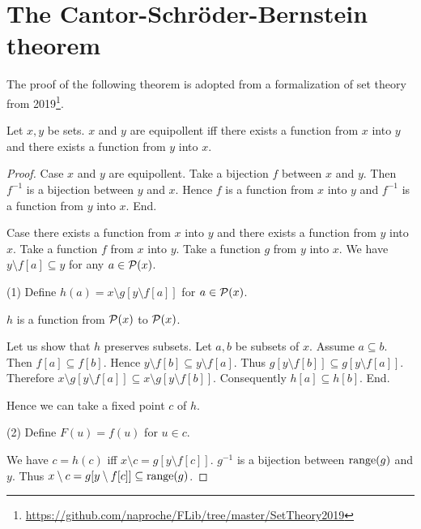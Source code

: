 \documentclass[../../sets-and-functions.ftl.tex]{subfiles}
\begin{document}
  \section{The Cantor-Schröder-Bernstein theorem}

  The proof of the following theorem is adopted from a formalization of set theory from 2019\footnote{\url{https://github.com/naproche/FLib/tree/master/SetTheory2019}}.

  \begin{forthel}
    \begin{theorem}
      Let $x,y$ be sets.
      $x$ and $y$ are equipollent iff there exists a function from $x$ into $y$ and there exists a function from $y$ into $x$.
    \end{theorem}
    \begin{proof}
      Case $x$ and $y$ are equipollent.
        Take a bijection $f$ between $x$ and $y$.
        Then $f^{-1}$ is a bijection between $y$ and $x$.
        Hence $f$ is a function from $x$ into $y$ and $f^{-1}$ is a function from $y$ into $x$.
      End.

      Case there exists a function from $x$ into $y$ and there exists a function from $y$ into $x$.
        Take a function $f$ from $x$ into $y$.
        Take a function $g$ from $y$ into $x$.
        We have $y \setminus f[a] \subseteq y$ for any $a \in \mathcal{P}(x)$.

        (1) Define $h(a) = x \setminus g[y \setminus f[a]]$ for $a \in \mathcal{P}(x)$.

        $h$ is a function from $\mathcal{P}(x)$ to $\mathcal{P}(x)$.

        Let us show that $h$ preserves subsets.
          Let $a,b$ be subsets of $x$.
          Assume $a \subseteq b$.
          Then $f[a] \subseteq f[b]$.
          Hence $y \setminus f[b] \subseteq y \setminus f[a]$.
          Thus $g[y \setminus f[b]] \subseteq g[y \setminus f[a]]$.
          Therefore $x \setminus g[y \setminus f[a]] \subseteq x \setminus g[y \setminus f[b]]$.
          Consequently $h[a] \subseteq h[b]$.
        End.

        Hence we can take a fixed point $c$ of $h$.

        (2) Define $F(u) = f(u)$ for $u \in c$.

        We have $c = h(c)$ iff $x \setminus c = g[y \setminus f[c]]$.
        $g^{-1}$ is a bijection between $\text{range}(g)$ and $y$.
        Thus $x \setminus c = g[y \setminus f[c]] \subseteq \text{range}(g)$.


\end{proof}
\end{forthel}
\end{document}

